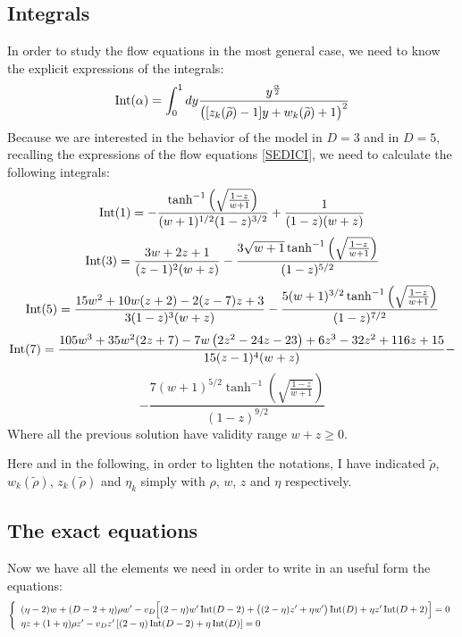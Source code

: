 \subsection{Integrals}
In order to study the flow equations in the most general case, we need to know the explicit expressions of the integrals:
\begin{equation}\label{4ediciotto}
\operatorname{Int}(\alpha) = \int_0^1 dy \frac{y^{\frac{\alpha}{2}}}{\big([z_k(\widetilde{\rho}) -1 ]y  +  w_k(\widetilde{\rho})+ 1\big)^2}
\end{equation}
Because we are interested in the behavior of the model in $D =3$ and in $D=5$, recalling the expressions of the flow equations \eqref{SEDICI},
we need to calculate the following integrals:
\begin{equation}\label{D1}
\operatorname{Int}(1) = - \frac{\tanh ^{-1}\left(\sqrt{\frac{1-z}{w+1}}\right)}{(w+1)^{1/2} (1-z)^{3/2}}+ \frac{1}{(1-z) (w+z)}
\end{equation}
\begin{equation}\label{D3}
\operatorname{Int}(3) = \frac{3 w+2 z+1}{(z-1)^2 (w+z)}-\frac{3 \sqrt{w+1} \tanh ^{-1}\left(\sqrt{\frac{1-z}{w+1}}\right)}{(1-z)^{5/2}}
\end{equation}
\begin{equation}\label{D5}
\operatorname{Int}(5) = \frac{15 w^2+10 w (z+2)-2 (z-7) z+3}{3 (1-z)^3 (w+z)}-\frac{5 (w+1)^{3/2} \tanh ^{-1}\left(\sqrt{\frac{1-z}{w+1}}\right)}{(1-z)^{7/2}}
\end{equation} 
\begin{equation}\label{D7}
\operatorname{Int}(7) = \frac{105 w^3+35 w^2 (2 z+7)-7 w \left(2 z^2-24 z-23\right)+6 z^3-32 z^2+116 z+15}{15 (z-1)^4 (w+z)}-
\end{equation}
\begin{equation*}
 - \frac{7 (w+1)^{5/2} \tanh ^{-1}\left(\sqrt{\frac{1-z}{w+1}}\right)}{(1-z)^{9/2}}
\end{equation*}
Where all the previous solution have validity range $w + z \geq 0$.

Here and in the following, in order to lighten the notations, I have indicated $\widetilde{\rho}$, $w_k(\widetilde{\rho})$, $ z_k(\widetilde{\rho})$ and $\eta_k$  simply with ${\rho}$, $w$, $z$ and $\eta$ respectively.

\subsection{The exact equations}
Now we have all the elements we need in order to write in an useful form the equations:
\begin{equation}\label{SEDICI}
\left\{
\begin{array}{l}
 (\eta -2)w + (D -2 +\eta){\rho} w' - v_D \Big[(2-\eta)w'\operatorname{Int}(D-2) + \big((2-\eta)z' + \eta w'\big)\operatorname{Int}(D) + \eta z'\operatorname{Int}(D + 2)\Big] = 0\\
\eta {z} + (1+\eta)\rho z'  - v_D {z'} \left[(2 - \eta)\operatorname{Int}(D-2) + \eta \operatorname{Int}(D)\right] = 0\\
\end{array}
\right.
\end{equation}
